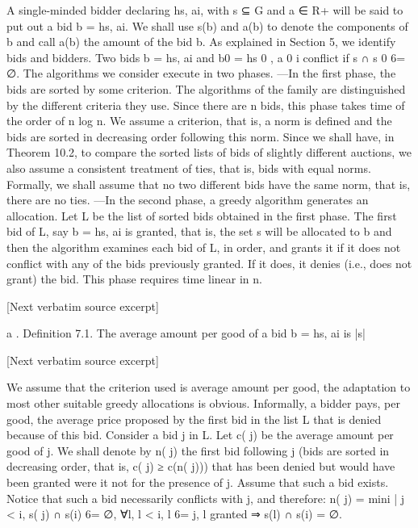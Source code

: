 \documentclass[10pt]{article}
\begin{document}
\begin{ReviewVerbatim}

A single-minded bidder declaring hs, ai, with s ⊆ G and a ∈ R+ will be said to
put out a bid b = hs, ai. We shall use s(b) and a(b) to denote the components of b
and call a(b) the amount of the bid b. As explained in Section 5, we identify bids
and bidders. Two bids b = hs, ai and b0 = hs 0 , a 0 i conflict if s ∩ s 0 6= ∅.
The algorithms we consider execute in two phases.
—In the first phase, the bids are sorted by some criterion. The algorithms of the
family are distinguished by the different criteria they use. Since there are n bids,
this phase takes time of the order of n log n. We assume a criterion, that is, a norm
is defined and the bids are sorted in decreasing order following this norm. Since
we shall have, in Theorem 10.2, to compare the sorted lists of bids of slightly
different auctions, we also assume a consistent treatment of ties, that is, bids
with equal norms. Formally, we shall assume that no two different bids have the
same norm, that is, there are no ties.
—In the second phase, a greedy algorithm generates an allocation. Let L be the
list of sorted bids obtained in the first phase. The first bid of L, say b = hs, ai is
granted, that is, the set s will be allocated to b and then the algorithm examines
each bid of L, in order, and grants it if it does not conflict with any of the bids
previously granted. If it does, it denies (i.e., does not grant) the bid. This phase
requires time linear in n.

[Next verbatim source excerpt]

a
.
Definition 7.1. The average amount per good of a bid b = hs, ai is |s|

[Next verbatim source excerpt]

We assume that the criterion used is average amount per good, the adaptation
to most other suitable greedy allocations is obvious. Informally, a bidder pays, per
good, the average price proposed by the first bid in the list L that is denied because
of this bid. Consider a bid j in L. Let c( j) be the average amount per good of j. We
shall denote by n( j) the first bid following j (bids are sorted in decreasing order,
that is, c( j) ≥ c(n( j))) that has been denied but would have been granted were it
not for the presence of j. Assume that such a bid exists. Notice that such a bid
necessarily conflicts with j, and therefore:
n( j) = min{i | j < i, s( j) ∩ s(i) 6= ∅, ∀l, l < i, l 6= j, l granted ⇒ s(l) ∩ s(i) = ∅}.
\end{ReviewVerbatim}
\end{document}
